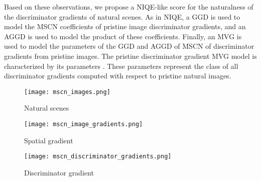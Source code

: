 \documentclass{article}
\begin{document}
Based on these observations, we propose a NIQE-like score for the naturalness of the discriminator gradients of natural scenes. As in NIQE, a GGD is used to model the MSCN coefficients of pristine image discriminator gradients, and an AGGD is used to model the product of these coefficients. Finally, an MVG is used to model the parameters of the GGD and AGGD of MSCN of discriminator gradients from pristine images. The pristine discriminator gradient MVG model is characterized by its parameters . These parameters represent the class of all discriminator gradients computed with respect to pristine natural images.
\begin{figure*}[htbp]
\centering
\begin{subfigure}[b]{0.32\textwidth}
\texttt{[image: mscn\_images.png]}
\caption{Natural scenes}
\label{subfig:ns}
\end{subfigure}
\begin{subfigure}[b]{0.32\textwidth}
\texttt{[image: mscn\_image\_gradients.png]}
\caption{Spatial gradient}
\label{subfig:nsg}
\end{subfigure}
\begin{subfigure}[b]{0.32\textwidth}
\texttt{[image: mscn\_discriminator\_gradients.png]}
\caption{Discriminator gradient}
\label{subfig:dg}
\end{subfigure}
\caption{The empirical histograms of MSCN coefficients. (\ref{subfig:ns}) Pristine natural scenes and their distorted versions. (\ref{subfig:nsg}) Spatial gradient of pristine natural scenes and their distorted versions. (\ref{subfig:dg}) Discriminator gradient of pristine natural scenes and their distorted versions.}
\label{fig:nss_grad}
\end{figure*}
\end{document}
